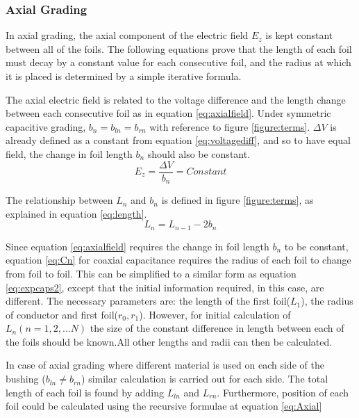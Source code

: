 \subsubsection{Axial Grading}
In axial grading, the axial component of the electric field $E_z$ is kept constant between all of the foils. 
The following equations prove that the length of each foil must decay by a constant value for each consecutive foil, and the radius at which it is placed is determined by a simple iterative formula.

The axial electric field is related to the voltage difference and the length change between each consecutive foil as in equation \ref{eq:axialfield}. 
Under symmetric capacitive grading, $b_n = b_{ln} = b_{rn}$ with reference to figure \ref{figure:terms}. 
$\Delta V$ is already defined as a constant from equation \ref{eq:voltagediff}, and so to have equal field, the change in foil length $b_n$ should also be constant.
\begin{equation}
   \label{eq:axialfield}
   E_z = \displaystyle\frac{\Delta V}{b_n} = Constant
\end{equation}

The relationship between $L_n$ and $b_n$ is defined in figure \ref{figure:terms}, as explained in equation \ref{eq:length}.
\begin{equation}
   \label{eq:length}
   L_n = L_{n-1} - 2b_n
\end{equation}

Since equation \ref{eq:axialfield} requires the change in foil length $b_n$ to be constant, equation \ref{eq:Cn} for coaxial capacitance requires the radius of each foil to change from foil to foil.
This can be simplified to a similar form as equation \ref{eq:expcaps2}, except that the initial information required, in this case, are different. The necessary parameters are: the length of the first foil($L_1$), the radius of conductor and first foil($r_0,r_1$). However, for initial calculation of $L_n (n=1,2,...N)$ the size of the constant difference in length between each of the foils should be known.All other lengths and radii can then be calculated.

In case of axial grading where different material is used on each side of the bushing ($b_{ln} \neq b_{rn}$) similar calculation is carried out for each side. The total length of each foil is found  by adding $L_{ln}$ and $L_{rn}$. Furthermore, position of each foil could be calculated using the recursive formulae at equation \ref{eq:Axial} 

